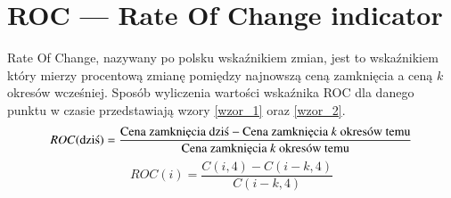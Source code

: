 \section{ROC --- Rate Of Change indicator}
\label{sec:1ROC}
Rate Of Change, nazywany po polsku wskaźnikiem zmian, jest to wskaźnikiem który
mierzy procentową zmianę pomiędzy najnowszą ceną
zamknięcia a ceną $k$ okresów wcześniej. Sposób wyliczenia wartości wskaźnika ROC dla danego punktu w czasie przedstawiają wzory \ref{wzor_1} oraz \ref{wzor_2}.
\begin{equation}
ROC(\text{dziś}) = \frac{\text{Cena zamknięcia dziś} - \text{Cena zamknięcia } k \text{ okresów temu}}{\text{Cena zamknięcia } k \text{ okresów temu}}\\
\label{wzor_1}
\end{equation}
\begin{equation}
ROC(i) = \frac{C(i,4) - C(i-k,4)}{C(i-k,4)}
\label{wzor_2}
\end{equation}

